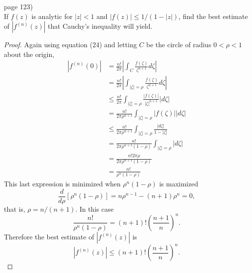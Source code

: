 \documentclass{article}
\newenvironment{problem}[2][Problem]{\begin{trivlist}
\item[\hskip \labelsep {\bfseries #1}\hskip \labelsep {\bfseries #2.}]}{\end{trivlist}}
\begin{document}
\pagebreak

\begin{problem}{4} (page 123) \\
  If $f(z)$ is analytic for $|z| < 1$ and $|f(z)| \leq 1/(1-|z|)$, find the best
  estimate of $|f^{(n)}(z)|$ that Cauchy's inequality will yield.
\end{problem}

\begin{proof}
  Again using equation (24) and letting $C$ be the circle of radius $0 < \rho < 1$ about the origin,
  \setcounter{equation}{0}
  \begin{align}
  |f^{(n)}(0)|
  &= \frac{n!}{2\pi}\left|\int_C \frac{f(\zeta)}{\zeta^{n+1}}d\zeta\right|\\
  &= \frac{n!}{2\pi}\left|\int_{|\zeta| = \rho} \frac{f(\zeta)}{\zeta^{n+1}}d\zeta\right|\\
  &\leq \frac{n!}{2\pi}\int_{|\zeta| = \rho} \frac{|f(\zeta)|}{|\zeta|^{n+1}}|d\zeta|\\
  &= \frac{n!}{2\pi\rho^{n+1}}\int_{|\zeta| = \rho} |f(\zeta)||d\zeta|\\
  &\leq \frac{n!}{2\pi\rho^{n+1}}\int_{|\zeta| = \rho} \frac{|d\zeta|}{1-|\zeta|}\\
  &= \frac{n!}{2\pi\rho^{n+1}(1-\rho)}\int_{|\zeta| = \rho} |d\zeta|\\
  &= \frac{n!2\pi\rho}{2\pi\rho^{n+1}(1-\rho)}\\
  &= \frac{n!}{\rho^n(1-\rho)}
  \end{align}
  This last expression is minimized when $\rho^n(1-\rho)$ is maximized \[
    \frac{d}{d\rho}[\rho^n(1-\rho)] = n\rho^{n-1} - (n + 1)\rho^n = 0,
  \] that is, $\rho = n/(n+1)$. In this case \[
    \frac{n!}{\rho^n(1-\rho)} = (n+1)!\left(\frac{n+1}{n}\right)^n.
  \] Therefore the best estimate of $|f^{(n)}(z)|$ is \[
    |f^{(n)}(z)| \leq (n+1)!\left(\frac{n+1}{n}\right)^n.
  \]
\end{proof}
\end{document}

